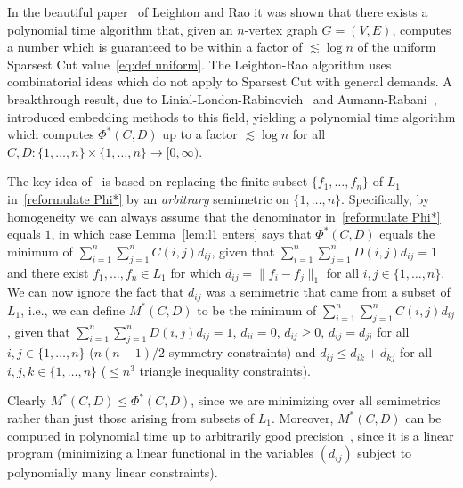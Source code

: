 \documentclass{icm2010}
\theoremstyle{definition}
\newcommand{\1}{\mathbf{1}}
\renewcommand{\le}{\leqslant}
\renewcommand{\ge}{\geqslant}
\begin{document}
In the beautiful paper~\cite{LR99} of Leighton and Rao it was shown
that there exists a polynomial time algorithm that, given an
$n$-vertex graph $G=(V,E)$, computes a number which is guaranteed to
be within a factor of $\lesssim \log n$ of the uniform Sparsest Cut
value~\eqref{eq:def uniform}. The Leighton-Rao algorithm uses
combinatorial ideas which do not apply to Sparsest Cut with general
demands. A breakthrough result, due to
Linial-London-Rabinovich~\cite{LLR95} and Aumann-Rabani~\cite{AR98},
introduced embedding methods to this field, yielding a polynomial
time algorithm which computes $\Phi^*(C,D)$ up to a factor $\lesssim
\log n$ for all $C,D:\{1,\ldots,n\}\times\{1,\ldots,n\}\to
[0,\infty)$.

The key idea of~\cite{LLR95,AR98} is based on replacing the finite
subset $\{f_1,\ldots,f_n\}$ of $L_1$ in~\eqref{reformulate Phi*} by
an {\em arbitrary} semimetric on $\{1,\ldots,n\}$. Specifically, by
homogeneity we can always assume that the denominator
in~\eqref{reformulate Phi*} equals $1$, in which case
Lemma~\ref{lem:l1 enters} says that $\Phi^*(C,D)$ equals the minimum
of $\sum_{i=1}^n\sum_{j=1}^nC(i,j)d_{ij}$, given that
$\sum_{i=1}^n\sum_{j=1}^n D(i,j)d_{ij}=1$ and there exist
$f_1,\ldots,f_n\in L_1$ for which $d_{ij}=\|f_i-f_j\|_1$ for all
$i,j\in \{1,\ldots,n\}$. We can now ignore the fact that $d_{ij}$
was a semimetric that came from a subset of $L_1$, i.e., we can
define $M^*(C,D)$ to be the minimum of
$\sum_{i=1}^n\sum_{j=1}^nC(i,j)d_{ij}$, given that
$\sum_{i=1}^n\sum_{j=1}^n D(i,j)d_{ij}=1$, $d_{ii}=0$, $d_{ij}\ge 0$, $d_{ij}=d_{ji}$ for
all $i,j\in \{1,\ldots,n\}$ ($n(n-1)/2$ symmetry constraints) and
$d_{ij}\le d_{ik}+d_{kj}$ for all $i,j,k\in \{1,\ldots,n\}$ ($\le
n^3$ triangle inequality constraints).

Clearly $M^*(C,D)\le \Phi^*(C,D)$, since we are minimizing over all
semimetrics rather than just those arising from subsets of $L_1$.
Moreover, $M^*(C,D)$ can be computed in polynomial time up to
arbitrarily good precision~\cite{GLS93}, since it is a linear
program (minimizing a linear functional in the variables $(d_{ij})$
subject to polynomially many linear constraints).
\end{document}
